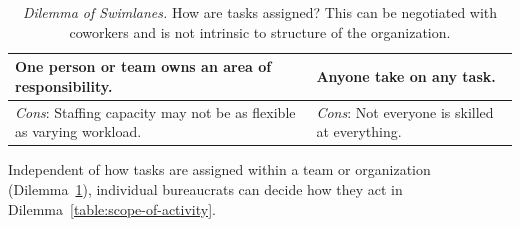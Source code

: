 \begin{center}
\begin{table}[H] %
\begin{tabular}{ | m{\dilemmatablewidth}| m{\dilemmatablewidth} | } 
  \hline
  \textbf{One person or team owns an area of responsibility.} & 
  \textbf{Anyone take on any task.} \\ 
  \hline
  \textit{Cons}: Staffing capacity may not be as flexible as varying workload. & 
  \textit{Cons}: Not everyone is skilled at everything. \\  
  \hline
\end{tabular}
\caption{
\textit{Dilemma of Swimlanes.} 
How are tasks assigned? This can be negotiated with coworkers and is not intrinsic to structure of the organization. 
}
\label{table:swimlanes}
\end{table}
\end{center}


Independent of how tasks are assigned within a team or organization (Dilemma~\ref{table:swimlanes}), individual bureaucrats can decide how they act in Dilemma~\ref{table:scope-of-activity}.



